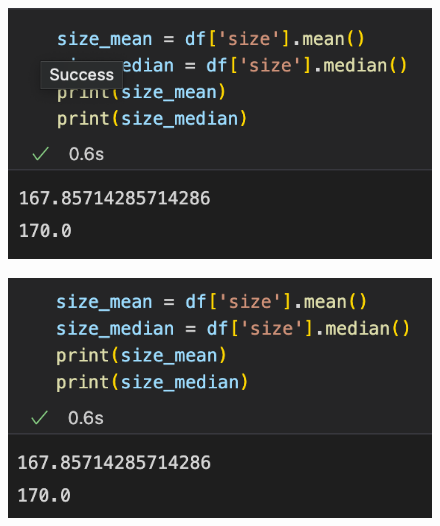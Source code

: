 \begin{frame}
   \begin{minipage}{0.26\linewidth}
      \begin{figure}[H]
         \includegraphics[scale=.35]{../images/illustrations/data_cleaning_na_imputation_const_2.png}
      \end{figure}
   \end{minipage}
      \begin{minipage}{0.45\linewidth}
      \begin{figure}[H]
         \includegraphics[scale=.35]{../images/illustrations/data_cleaning_na_imputation_const_3.png}
      \end{figure}
   \end{minipage}
   \begin{minipage}{0.18\linewidth}
      \begin{figure}[H]

\end{figure}
\end{minipage}
\end{frame}
